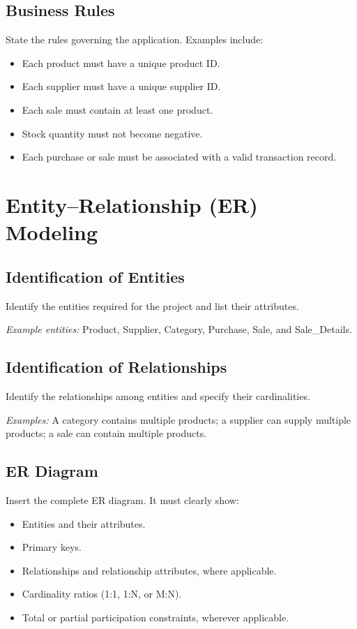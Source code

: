\documentclass[12pt,a4paper]{report}
\begin{document}
\section{Business Rules}
State the rules governing the application. Examples include:
\begin{itemize}
    \item Each product must have a unique product ID.
    \item Each supplier must have a unique supplier ID.
    \item Each sale must contain at least one product.
    \item Stock quantity must not become negative.
    \item Each purchase or sale must be associated with a valid transaction record.
\end{itemize}

\chapter{Entity--Relationship (ER) Modeling}

\section{Identification of Entities}
Identify the entities required for the project and list their attributes.

\noindent\textit{Example entities:} Product, Supplier, Category, Purchase, Sale, and Sale\_Details.

\section{Identification of Relationships}
Identify the relationships among entities and specify their cardinalities.

\noindent\textit{Examples:} A category contains multiple products; a supplier can supply multiple products; a sale can contain multiple products.

\section{ER Diagram}
Insert the complete ER diagram. It must clearly show:
\begin{itemize}
    \item Entities and their attributes.
    \item Primary keys.
    \item Relationships and relationship attributes, where applicable.
    \item Cardinality ratios (1:1, 1:N, or M:N).
    \item Total or partial participation constraints, wherever applicable.
\end{itemize}
\end{document}
